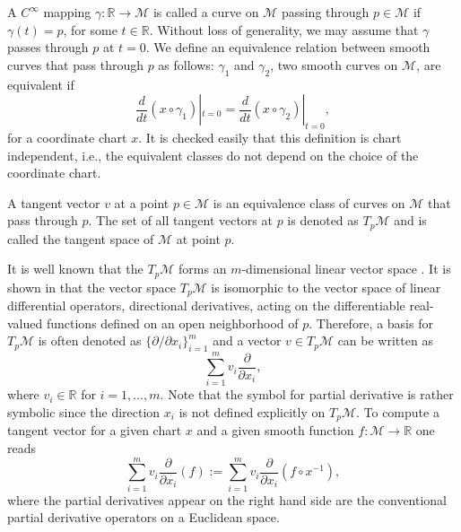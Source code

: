 A $C^{\infty}$ mapping $\gamma:\mathbb R \to \mathcal M$ is called a curve on $\mathcal M$ passing through $p\in \mathcal M$ if $\gamma(t) = p$, for some $t\in \mathbb R$. Without loss of generality, we may assume that $\gamma$ passes through $p$ at $t=0$. We define an equivalence relation between smooth curves that pass through $p$ as follows: $\gamma_1$ and $\gamma_2$, two smooth curves on $\mathcal M$, are equivalent if
\begin{equation} \label{eq:2.1}
	\frac{d}{dt}(x\circ \gamma_1)|_{t=0} = \frac{d}{dt}(x\circ \gamma_2)|_{t=0},
\end{equation}
for a coordinate chart $x$. It is checked easily that this definition is chart independent, i.e., the equivalent classes do not depend on the choice of the coordinate chart.
\begin{definition}
A tangent vector $v$ at a point $p\in \mathcal M$ is an equivalence class of curves on $\mathcal M$ that pass through $p$. The set of all tangent vectors at $p$ is denoted as $T_p\mathcal M$ and is called the tangent space of $\mathcal M$ at point $p$.
\end{definition}
It is well known that the $T_p\mathcal M$ forms an $m$-dimensional linear vector space \cite{robbin2011introduction}. It is shown in \cite{robbin2011introduction} that the vector space $T_p\mathcal M$ is isomorphic to the vector space of linear differential operators, directional derivatives, acting on the differentiable real-valued functions defined on an open neighborhood of $p$. Therefore, a basis for $T_p\mathcal M$ is often denoted as $\{ \partial /\partial x_i \}_{i=1}^{m}$ and a vector $v\in T_p\mathcal M$ can be written as 
\begin{equation} \label{eq:2.11}
	\sum_{i=1}^m v_i \frac{\partial}{\partial x_i},
\end{equation}
where $v_i\in \mathbb R$ for $i = 1,\dots,m$. Note that the symbol for partial derivative is rather symbolic since the direction $x_i$ is not defined explicitly on $T_p\mathcal M$. To compute a tangent vector for a given chart $x$ and a given smooth function $f:\mathcal M \to \mathbb R$ one reads
\begin{equation} \label{eq:2.12}
	\sum_{i=1}^m v_i \frac{\partial}{\partial x_i} (f) := \sum_{i=1}^m v_i \frac{\partial}{\partial x_i} (f \circ x^{-1}),
\end{equation}
where the partial derivatives appear on the right hand side are the conventional partial derivative operators on a Euclidean space.

